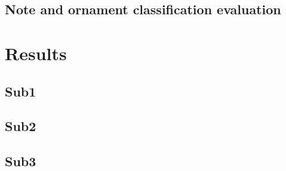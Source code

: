 \documentclass{article}
\begin{document}
{{{\subsection{Note and ornament classification evaluation}

%


\section{Results}\label{sec:results}

\subsection{Sub1}



\subsection{Sub2}





\subsection{Sub3}






}}}
\end{document}
